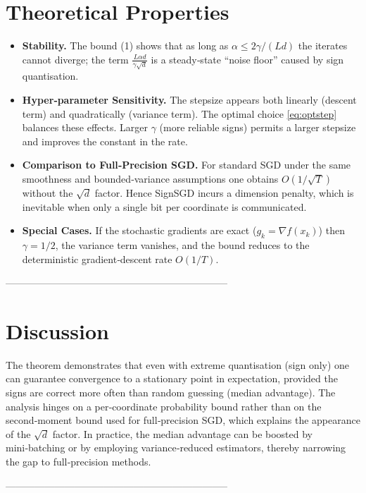 \documentclass{article}
\begin{document}
\section*{Theoretical Properties}
\begin{itemize}
\item \textbf{Stability.}
The bound (1) shows that as long as $\alpha\le 2\gamma/(Ld)$ the
iterates cannot diverge; the term $\frac{L\alpha d}{\gamma\sqrt{d}}$ is a
steady‑state ``noise floor'' caused by sign quantisation.

\item \textbf{Hyper‑parameter Sensitivity.}
The stepsize appears both linearly (descent term) and quadratically
(variance term). The optimal choice \eqref{eq:optstep} balances these
effects. Larger $\gamma$ (more reliable signs) permits a larger stepsize and
improves the constant in the rate.

\item \textbf{Comparison to Full‑Precision SGD.}
For standard SGD under the same smoothness and bounded‑variance
assumptions one obtains $O(1/\sqrt{T})$ without the $\sqrt{d}$ factor.
Hence SignSGD incurs a dimension penalty, which is inevitable when only a
single bit per coordinate is communicated.

\item \textbf{Special Cases.}
If the stochastic gradients are exact ($g_k=\nabla f(x_k)$) then $\gamma=1/2$,
the variance term vanishes, and the bound reduces to the deterministic
gradient‑descent rate $O(1/T)$.
\end{itemize}

--------------------------------------------------------------------

\section*{Discussion}
The theorem demonstrates that even with extreme quantisation (sign only) one
can guarantee convergence to a stationary point in expectation, provided the
signs are correct more often than random guessing (median advantage).  The
analysis hinges on a per‑coordinate probability bound rather than on the
second‑moment bound used for full‑precision SGD, which explains the appearance
of the $\sqrt{d}$ factor.  In practice, the median advantage can be boosted by
mini‑batching or by employing variance‑reduced estimators, thereby narrowing
the gap to full‑precision methods.

--------------------------------------------------------------------
\end{document}
